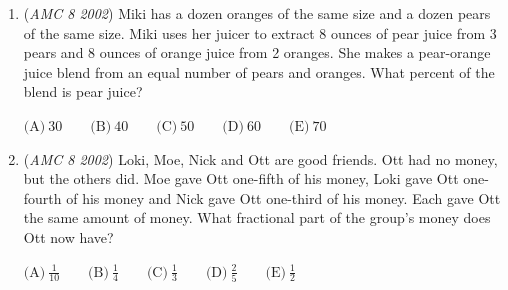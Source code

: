 \begin{enumerate}
	\item (\textit{AMC 8 2002}) Miki has a dozen oranges of the same size and a dozen pears of the same size. Miki uses her juicer to extract 8 ounces of pear juice from 3 pears and 8 ounces of orange juice from 2 oranges. She makes a pear-orange juice blend from an equal number of pears and oranges. What percent of the blend is pear juice?


 $\text{(A)}\ 30 \qquad \text{(B)}\ 40 \qquad \text{(C)}\ 50 \qquad \text{(D)}\ 60 \qquad \text{(E)}\ 70$


	\item (\textit{AMC 8 2002}) Loki, Moe, Nick and Ott are good friends. Ott had no money, but the others did. Moe gave Ott one-fifth of his money, Loki gave Ott one-fourth of his money and Nick gave Ott one-third of his money. Each gave Ott the same amount of money. What fractional part of the group's money does Ott now have?


 $\text{(A)}\ \frac{1}{10} \qquad \text{(B)}\ \frac{1}{4} \qquad \text{(C)}\ \frac{1}{3} \qquad \text{(D)}\ \frac{2}{5} \qquad \text{(E)}\ \frac{1}{2}$


\end{enumerate}